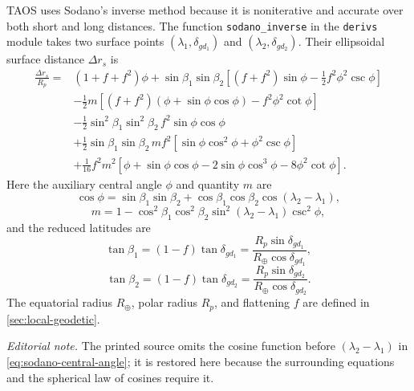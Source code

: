 TAOS uses Sodano's inverse method because it is noniterative and accurate over both
short and long distances. The function \texttt{sodano\_inverse} in
the \texttt{derivs} module takes two surface points
$(\lambda_1,\delta_{gd_1})$ and $(\lambda_2,\delta_{gd_2})$. Their ellipsoidal
surface distance $\Delta r_s$ is
\begin{equation}
\begin{aligned}
\frac{\Delta r_s}{R_p}={}&(1+f+f^2)\phi
 +\sin\beta_1\sin\beta_2
  \left[(f+f^2)\sin\phi-\frac12 f^2\phi^2\csc\phi\right]\\
&-\frac12m\left[(f+f^2)(\phi+\sin\phi\cos\phi)
                 -f^2\phi^2\cot\phi\right]\\
&-\frac12\sin^2\beta_1\sin^2\beta_2\,f^2\sin\phi\cos\phi\\
&+\frac12\sin\beta_1\sin\beta_2\,m f^2
  \left[\sin\phi\cos^2\phi+\phi^2\csc\phi\right]\\
&+\frac1{16}f^2m^2
  \left[\phi+\sin\phi\cos\phi-2\sin\phi\cos^3\phi
        -8\phi^2\cot\phi\right].
\end{aligned}
\label{eq:sodano-inverse-distance}
\end{equation}
Here the auxiliary central angle $\phi$ and quantity $m$ are
\begin{equation}
  \cos\phi
  =\sin\beta_1\sin\beta_2
   +\cos\beta_1\cos\beta_2\cos(\lambda_2-\lambda_1),
  \label{eq:sodano-central-angle}
\end{equation}
\begin{equation}
  m=1-\cos^2\beta_1\cos^2\beta_2
       \sin^2(\lambda_2-\lambda_1)\csc^2\phi,
  \label{eq:sodano-inverse-m}
\end{equation}
and the reduced latitudes are
\begin{equation}
  \tan\beta_1
  =(1-f)\tan\delta_{gd_1}
  =\frac{R_p\sin\delta_{gd_1}}{R_{\oplus}\cos\delta_{gd_1}},
  \label{eq:sodano-beta1}
\end{equation}
\begin{equation}
  \tan\beta_2
  =(1-f)\tan\delta_{gd_2}
  =\frac{R_p\sin\delta_{gd_2}}{R_{\oplus}\cos\delta_{gd_2}}.
  \label{eq:sodano-beta2}
\end{equation}
The equatorial radius $R_{\oplus}$, polar radius $R_p$, and flattening $f$ are
defined in \cref{sec:local-geodetic}.

\noindent\textit{Editorial note.} The printed source omits the cosine function
before $(\lambda_2-\lambda_1)$ in \cref{eq:sodano-central-angle}; it is restored
here because the surrounding equations and the spherical law of cosines require it.

